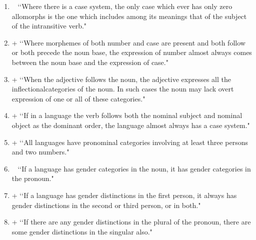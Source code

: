 \begin{enumerate}
\item ~  \lq\lq Where there is a case system, the only case which ever has only zero allomorphs is the one which includes among its meanings that of the subject of the intransitive verb." 

\item +  \lq\lq Where morphemes of both number and case are present and both follow or both precede the noun base, the expression of number almost always comes between the noun base and the expression of case." 

\item +  \lq\lq When the adjective follows the noun, the adjective expresses all the inflectionalcategories of the noun. In such cases the noun may lack overt expression of one or all of these categories." 

\item +  \lq\lq If in a language the verb follows both the nominal subject and nominal object as the dominant order, the language almost always has a case system." 

\item +  \lq\lq All languages have pronominal categories involving at least three persons and two numbers." 

\item ~  \lq\lq If a language has gender categories in the noun, it has gender categories in the pronoun." 

\item + \lq\lq If a language has gender distinctions in the first person, it always has gender distinctions in the second or third person, or in both." 

\item + \lq\lq If there are any gender distinctions in the plural of the pronoun, there are some gender distinctions in the singular also."


\end{enumerate}
\endgroup


\vfill
